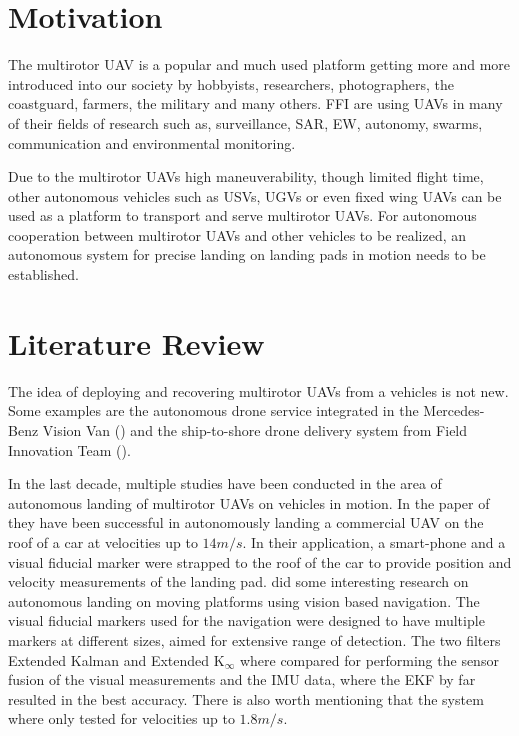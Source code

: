 \section{Motivation} %
\label{sec:motivation}
The multirotor \gls{UAV} is a popular and much used platform getting more and more introduced into our society by hobbyists, researchers, photographers, the coastguard, farmers, the military and many others. \gls{FFI} are using UAVs in many of their fields of research such as, surveillance, \gls{SAR}, \gls{EW}, autonomy, swarms, communication and environmental monitoring.

Due to the multirotor \glspl{UAV} high maneuverability, though limited flight time, other autonomous vehicles such as \glspl{USV}, \glspl{UGV} or even fixed wing \glspl{UAV} can be used as a platform to transport and serve multirotor \glspl{UAV}. For autonomous cooperation between multirotor UAVs and other vehicles to be realized, an autonomous system for precise landing on landing pads in motion needs to be established.

\section{Literature Review} %
\label{sec:literature_review}

The idea of deploying and recovering multirotor \glspl{UAV} from a vehicles is not new. Some examples are the autonomous drone service integrated in the Mercedes-Benz Vision Van (\cite{daimlerVisionVan}) and 
the ship-to-shore drone delivery system from Field Innovation Team (\cite{theguardian:UAV}).

In the last decade, multiple studies have been conducted in the area of autonomous landing of multirotor \glspl{UAV} on vehicles in motion. In the paper of \cite{borowczyk2016autonomous} they have been successful in autonomously landing a commercial \gls{UAV} on the roof of a car at velocities up to $14m/s$. In their application, a smart-phone and a visual fiducial marker were strapped to the roof of the car to provide position and velocity measurements of the landing pad. \cite{araar2017vision} did some interesting research on autonomous landing on moving platforms using vision based navigation. The visual fiducial markers used for the navigation were designed to have multiple markers at different sizes, aimed for extensive range of detection. The two filters Extended Kalman and Extended $\text{K}_\infty$ where compared for performing the sensor fusion of the visual measurements and the \gls{IMU} data, where the \gls{EKF} by far resulted in the best accuracy. There is also worth mentioning that the system where only tested for velocities up to $1.8m/s$.

